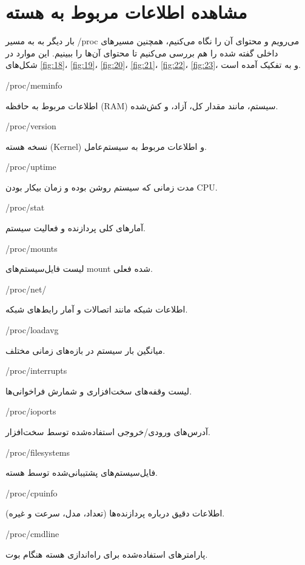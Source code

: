 \documentclass[12pt]{article}
\begin{document}
	\newpage
	\section{مشاهده اطلاعات مربوط به هسته}
	بار دیگر به به مسیر /proc می‌رویم و محتوای آن را نگاه می‌کنیم، همچنین مسیر‌های داخلی گفته شده را هم بررسی می‌کنیم تا محتوای آن‌ها را ببینیم. این موارد در شکل‌های 
	\ref{fig:18}،
	\ref{fig:19}،
	\ref{fig:20}،
	\ref{fig:21}،
	\ref{fig:22}،
	\ref{fig:23}، و
	به تفکیک آمده است.
	
	/proc/meminfo
	
	 اطلاعات مربوط به حافظه (RAM) سیستم، مانند مقدار کل، آزاد، و کش‌شده.
	
	/proc/version
	
	 نسخه هسته (Kernel) و اطلاعات مربوط به سیستم‌عامل.
	
	/proc/uptime
	
	 مدت زمانی که سیستم روشن بوده و زمان بیکار بودن \textenglish{CPU}.
	
	/proc/stat
	
	 آمارهای کلی پردازنده و فعالیت سیستم.
	
	/proc/mounts
	
	 لیست فایل‌سیستم‌های mount شده فعلی.
	
	/proc/net/
	
	 اطلاعات شبکه مانند اتصالات و آمار رابط‌های شبکه.
	
	/proc/loadavg
	
	 میانگین بار سیستم در بازه‌های زمانی مختلف.
	
	/proc/interrupts
	
	 لیست وقفه‌های سخت‌افزاری و شمارش فراخوانی‌ها.
	
	/proc/ioports
	
	 آدرس‌های ورودی/خروجی استفاده‌شده توسط سخت‌افزار.
	
	/proc/filesystems
	
	 فایل‌سیستم‌های پشتیبانی‌شده توسط هسته.
	
	/proc/cpuinfo
	
	 اطلاعات دقیق درباره پردازنده‌ها (تعداد، مدل، سرعت و غیره).
	
	/proc/cmdline
	
	 پارامترهای استفاده‌شده برای راه‌اندازی هسته هنگام بوت.
	
\end{document}
